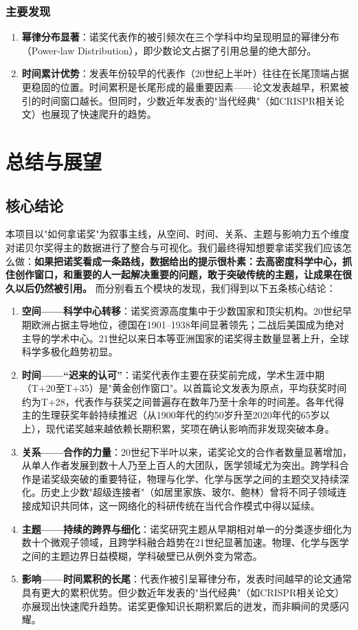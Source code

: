 \documentclass[UTF8]{CjC}
\theoremstyle{mystyle}
\begin{document}
\subsubsection{主要发现}
\begin{enumerate}
    \item \textbf{幂律分布显著}：诺奖代表作的被引频次在三个学科中均呈现明显的幂律分布（Power-law Distribution），即少数论文占据了引用总量的绝大部分。
    \item \textbf{时间累计优势}：发表年份较早的代表作（20世纪上半叶）往往在长尾顶端占据更稳固的位置。时间累积是长尾形成的最重要因素——论文发表越早，积累被引的时间窗口越长。但同时，少数近年发表的"当代经典"（如CRISPR相关论文）也展现了快速爬升的趋势。
\end{enumerate}

\section{总结与展望}
\subsection{核心结论}
本项目以"如何拿诺奖"为叙事主线，从空间、时间、关系、主题与影响力五个维度对诺贝尔奖得主的数据进行了整合与可视化。我们最终得知想要拿诺奖我们应该怎么做：\textbf{如果把诺奖看成一条路线，数据给出的提示很朴素：去高密度科学中心，抓住创作窗口，和重要的人一起解决重要的问题，敢于突破传统的主题，让成果在很久以后仍然被引用。}
而分别看五个模块的发现，我们得到以下五条核心结论：
\begin{enumerate}
    \item \textbf{空间——科学中心转移}：诺奖资源高度集中于少数国家和顶尖机构。20世纪早期欧洲占据主导地位，德国在1901–1938年间显著领先；二战后美国成为绝对主导的学术中心。21世纪以来日本等亚洲国家的诺奖得主数量显著上升，全球科学多极化趋势初显。
    \item \textbf{时间——“迟来的认可”}：诺奖代表作主要在获奖前完成，学术生涯中期（T+20至T+35）是"黄金创作窗口"。以首篇论文发表为原点，平均获奖时间约为T+28，代表作与获奖之间普遍存在数年乃至十余年的时间差。各年代得主的生理获奖年龄持续推迟（从1900年代的约50岁升至2020年代的65岁以上），现代诺奖越来越依赖长期积累，奖项在确认影响而非发现突破本身。
    \item \textbf{关系——合作的力量}：20世纪下半叶以来，诺奖论文的合作者数量显著增加，从单人作者发展到数十人乃至上百人的大团队，医学领域尤为突出。跨学科合作是诺奖级突破的重要特征，物理与化学、化学与医学之间的主题交叉持续深化。历史上少数"超级连接者"（如居里家族、玻尔、鲍林）曾将不同子领域连接成知识共同体，这一网络化的科研传统在当代合作模式中得以延续。
    \item \textbf{主题——持续的跨界与细化}：诺奖研究主题从早期相对单一的分类逐步细化为数十个微观子领域，且跨学科融合趋势在21世纪显著加速。物理、化学与医学之间的主题边界日益模糊，学科破壁已从例外变为常态。
    \item \textbf{影响——时间累积的长尾}：代表作被引呈幂律分布，发表时间越早的论文通常具有更大的累积优势。但少数近年发表的"当代经典"（如CRISPR相关论文）亦展现出快速爬升趋势。诺奖更像知识长期积累后的迸发，而非瞬间的灵感闪耀。
\end{enumerate}
\end{document}
